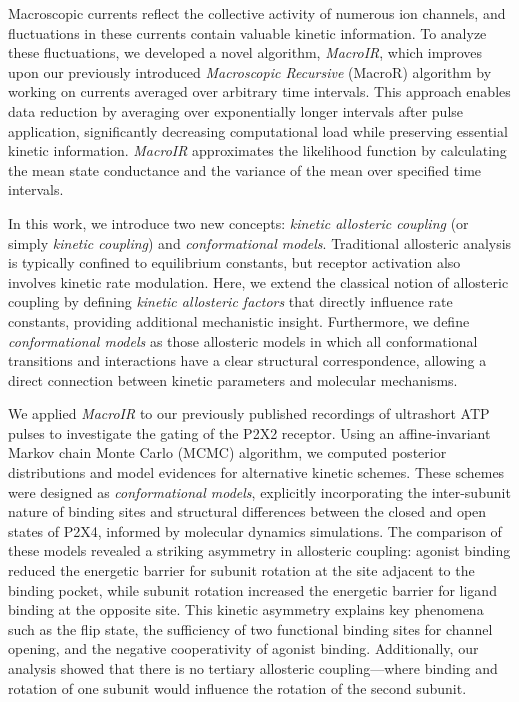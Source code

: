 \documentclass[pdflatex,sn-mathphys-num]{sn-jnl}%
\theoremstyle{thmstyleone}%
\theoremstyle{thmstyletwo}%
\theoremstyle{thmstylethree}%
\begin{document}
Macroscopic currents reflect the collective activity of numerous ion channels, and fluctuations in these currents contain valuable kinetic information. To analyze these fluctuations, we developed a novel algorithm, \textit{MacroIR}, which improves upon our previously introduced \textit{Macroscopic Recursive} (MacroR) algorithm by working on currents averaged over arbitrary time intervals. This approach enables data reduction by averaging over exponentially longer intervals after pulse application, significantly decreasing computational load while preserving essential kinetic information. \textit{MacroIR} approximates the likelihood function by calculating the mean state conductance and the variance of the mean over specified time intervals.  

In this work, we introduce two new concepts: \textit{kinetic allosteric coupling} (or simply \textit{kinetic coupling}) and \textit{conformational models}. Traditional allosteric analysis is typically confined to equilibrium constants, but receptor activation also involves kinetic rate modulation. Here, we extend the classical notion of allosteric coupling by defining \textit{kinetic allosteric factors} that directly influence rate constants, providing additional mechanistic insight. Furthermore, we define \textit{conformational models} as those allosteric models in which all conformational transitions and interactions have a clear structural correspondence, allowing a direct connection between kinetic parameters and molecular mechanisms.  

We applied \textit{MacroIR} to our previously published recordings of ultrashort ATP pulses to investigate the gating of the P2X2 receptor. Using an affine-invariant Markov chain Monte Carlo (MCMC) algorithm, we computed posterior distributions and model evidences for alternative kinetic schemes. These schemes were designed as \textit{conformational models}, explicitly incorporating the inter-subunit nature of binding sites and structural differences between the closed and open states of P2X4, informed by molecular dynamics simulations. The comparison of these models revealed a striking asymmetry in allosteric coupling: agonist binding reduced the energetic barrier for subunit rotation at the site adjacent to the binding pocket, while subunit rotation increased the energetic barrier for ligand binding at the opposite site. This kinetic asymmetry explains key phenomena such as the flip state, the sufficiency of two functional binding sites for channel opening, and the negative cooperativity of agonist binding. Additionally, our analysis showed that there is no tertiary allosteric coupling—where binding and rotation of one subunit would influence the rotation of the second subunit.  
\end{document}
